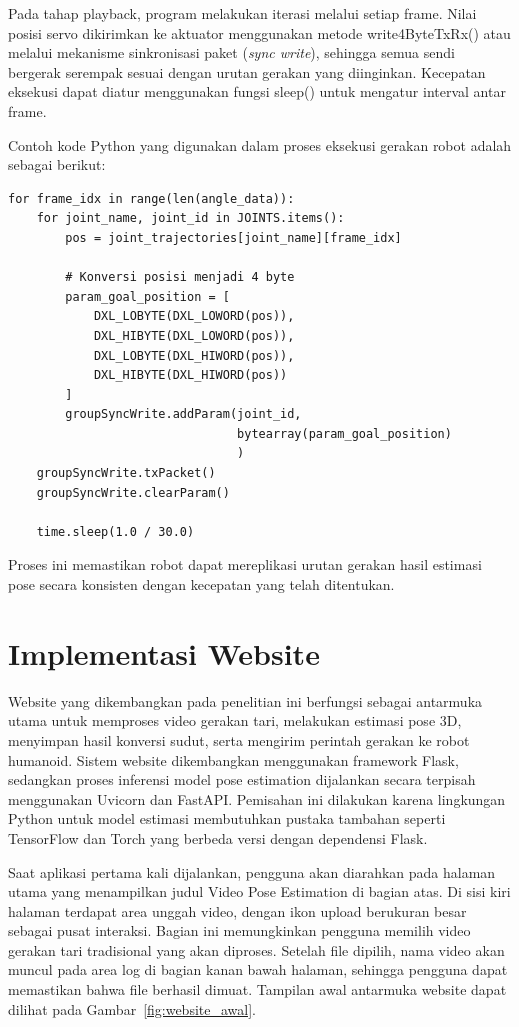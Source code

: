 Pada tahap playback, program melakukan iterasi melalui setiap frame. Nilai posisi servo dikirimkan ke aktuator menggunakan metode write4ByteTxRx() atau melalui mekanisme sinkronisasi paket (\textit{sync write}), sehingga semua sendi bergerak serempak sesuai dengan urutan gerakan yang diinginkan. Kecepatan eksekusi dapat diatur menggunakan fungsi sleep() untuk mengatur interval antar frame.

Contoh kode Python yang digunakan dalam proses eksekusi gerakan robot adalah sebagai berikut:

\begin{lstlisting}[style=plainbox, caption={Kode eksekusi playback gerakan pada robot humanoid}]
for frame_idx in range(len(angle_data)):
    for joint_name, joint_id in JOINTS.items():
        pos = joint_trajectories[joint_name][frame_idx]

        # Konversi posisi menjadi 4 byte
        param_goal_position = [
            DXL_LOBYTE(DXL_LOWORD(pos)),
            DXL_HIBYTE(DXL_LOWORD(pos)),
            DXL_LOBYTE(DXL_HIWORD(pos)),
            DXL_HIBYTE(DXL_HIWORD(pos))
        ]
        groupSyncWrite.addParam(joint_id, 
                                bytearray(param_goal_position)
                                )
    groupSyncWrite.txPacket()
    groupSyncWrite.clearParam()

    time.sleep(1.0 / 30.0)
\end{lstlisting}

Proses ini memastikan robot dapat mereplikasi urutan gerakan hasil estimasi pose secara konsisten dengan kecepatan yang telah ditentukan.



\section{Implementasi Website}

Website yang dikembangkan pada penelitian ini berfungsi sebagai antarmuka utama untuk memproses video gerakan tari, melakukan estimasi pose 3D, menyimpan hasil konversi sudut, serta mengirim perintah gerakan ke robot humanoid. Sistem website dikembangkan menggunakan framework Flask, sedangkan proses inferensi model pose estimation dijalankan secara terpisah menggunakan Uvicorn dan FastAPI. Pemisahan ini dilakukan karena lingkungan Python untuk model estimasi membutuhkan pustaka tambahan seperti TensorFlow dan Torch yang berbeda versi dengan dependensi Flask.

Saat aplikasi pertama kali dijalankan, pengguna akan diarahkan pada halaman utama yang menampilkan judul Video Pose Estimation di bagian atas. Di sisi kiri halaman terdapat area unggah video, dengan ikon upload berukuran besar sebagai pusat interaksi. Bagian ini memungkinkan pengguna memilih video gerakan tari tradisional yang akan diproses. Setelah file dipilih, nama video akan muncul pada area log di bagian kanan bawah halaman, sehingga pengguna dapat memastikan bahwa file berhasil dimuat. Tampilan awal antarmuka website dapat dilihat pada Gambar~\ref{fig:website_awal}.


